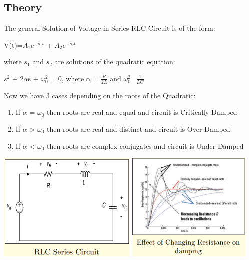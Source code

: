 \documentclass{article}
\begin{document}
\subsection{Theory}
The general Solution of Voltage in Series RLC Circuit is of the form:\\
\begin{center}
    V(t)=$A_{1}$$e^{-s_{1}t}$ + $A_{2}$$e^{-s_{2}t}$
\end{center}
where $s_{1}$ and $s_{2}$ are solutions of the quadratic equation:\\
\begin{center}
    $s^{2}$ + 2$\alpha$s + $\omega_{0}^{2}$ = 0, where $\alpha$ = $\frac{R}{2L}$ and $\omega_{0}^{2}$=$\frac{1}{LC}$
\end{center}
Now we have 3 cases depending on the roots of the Quadratic:
\begin{enumerate}
    \item If $\alpha$ = $\omega_{0}$ then roots are real and equal and circuit is Critically Damped
    \item If $\alpha$ > $\omega_{0}$ then roots are real and distinct and circuit is Over Damped
    \item If $\alpha$ < $\omega_{0}$ then roots are complex conjugates and circuit is Under Damped
\end{enumerate}
\begin{center}
    \includegraphics[width=0.50\textwidth]{i6.png}
    \includegraphics[width=0.45\textwidth]{i7.png}
\end{center}
\end{document}
